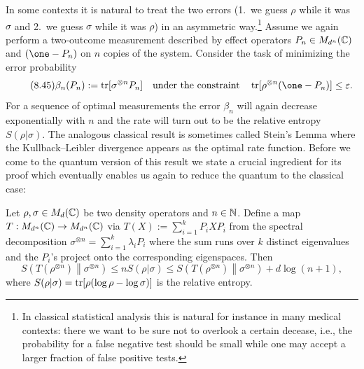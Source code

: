 \documentclass[11pt,a4paper]{article}
\theoremstyle{plain}
\theoremstyle{definition}
\theoremstyle{remark}
\begin{document}
In some contexts it is natural to treat the two errors (1.\ we guess $\rho$ while it was $\sigma$ and 2.\ we guess $\sigma$ while it was $\rho$) in an asymmetric way.\footnote{In classical statistical analysis this is natural for instance in many medical contexts:
    there we want to be sure not to overlook a certain decease, i.e., the probability for a false negative test should be small while one may accept a larger fraction of false positive tests.}
Assume we again perform a two-outcome measurement described by effect operators $P_n\in M_{d^n}(\mathbb{C})$ and $(\one-P_n)$ on $n$ copies of the system.
Consider the task of minimizing the error probability
\begin{equation}\tag{8.45}
    \beta_n(P_n) := \tr[\sigma^{\otimes n}P_n]
    \quad\text{under the constraint}\quad
    \tr[\rho^{\otimes n}(\one-P_n)] \le \varepsilon.
\end{equation}
For a sequence of optimal measurements the error $\beta_n$ will again decrease exponentially with $n$ and the rate will turn out to be the relative entropy $S(\rho|\sigma)$.
The analogous classical result is sometimes called Stein's Lemma where the Kullback--Leibler divergence appears as the optimal rate function. Before we
come to the quantum version of this result we state a crucial ingredient for its proof which eventually enables us again to reduce the quantum to the classical case:

\begin{theorem}
    Let $\rho,\sigma\in M_d(\mathbb{C})$ be two density operators and $n\in\mathbb{N}$. Define a map $T:M_{d^n}(\mathbb{C})\to M_{d^n}(\mathbb{C})$ via
    $T(X):=\sum_{i=1}^k P_i X P_i$ from the spectral decomposition $\sigma^{\otimes n}=\sum_{i=1}^k \lambda_i P_i$ where the sum runs over $k$ distinct eigenvalues and the $P_i$'s project onto the corresponding eigenspaces. Then
    \begin{equation}\tag{8.46}
        S\!\left(T(\rho^{\otimes n})\middle\|\sigma^{\otimes n}\right)
        \le nS(\rho|\sigma)
        \le S\!\left(T(\rho^{\otimes n})\middle\|\sigma^{\otimes n}\right) + d\log(n+1),
    \end{equation}
    where $S(\rho|\sigma)=\operatorname{tr}[\rho(\log\rho-\log\sigma)]$ is the relative entropy.
\end{theorem}
\end{document}
